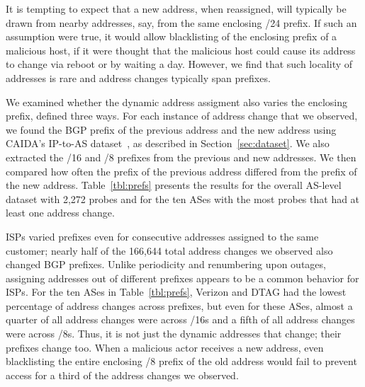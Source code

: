 It is tempting to expect that a new address, when
reassigned, will typically be drawn from nearby addresses,
say, from the same enclosing /24 prefix.  If such an
assumption were true, it would allow blacklisting of the
enclosing prefix of a malicious host, if it were thought
that the malicious host could cause its address to change
via reboot or by waiting a day.  However, we find that such
locality of addresses is rare and address changes typically
span prefixes.

We examined whether the dynamic address assigment also varies the
enclosing prefix, defined three ways. 
For each instance of address change that
we observed, we found the BGP prefix of the previous address and the
new address using CAIDA's IP-to-AS
dataset~\cite{caidapfx2as}, as described in
Section~\ref{sec:dataset}. We also extracted the /16 and /8 prefixes from the
previous and new addresses.  We then compared how often the prefix of
the previous address differed from the prefix of the new address.  
Table~\ref{tbl:prefs} presents the results for the overall AS-level dataset with 2,272
probes and for the ten ASes with the most probes that
had at least one address change.

ISPs varied prefixes even for consecutive addresses
assigned to the same customer; nearly half of the 166,644 total address
changes we observed also changed BGP prefixes. Unlike periodicity and renumbering upon
outages, assigning addresses out of different prefixes appears to be a
common behavior for ISPs. For the ten ASes in
Table~\ref{tbl:prefs}, Verizon and DTAG had the lowest percentage of
address changes across prefixes, but even for these ASes, almost a
quarter of all address changes were across /16s and a fifth of all
address changes were across /8s. Thus, it is not just
the dynamic addresses that change; their prefixes change too. When a
malicious actor receives a new address, even blacklisting the entire
enclosing /8 prefix of the old address would fail to prevent access
for a third of
the address changes we observed.